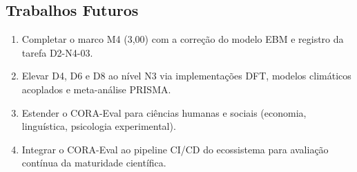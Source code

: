 \documentclass[12pt,a4paper,oneside]{article}
\begin{document}
\subsection{Trabalhos Futuros}

\begin{enumerate}[label=(\roman*)]
\item Completar o marco M4 (3,00) com a correção do modelo EBM e registro
      da tarefa D2-N4-03.
\item Elevar D4, D6 e D8 ao nível N3 via implementações DFT, modelos
      climáticos acoplados e meta-análise PRISMA.
\item Estender o CORA-Eval para ciências humanas e sociais (economia,
      linguística, psicologia experimental).
\item Integrar o CORA-Eval ao pipeline CI/CD do ecossistema para avaliação
      contínua da maturidade científica.
\end{enumerate}

\newpage
\end{document}
